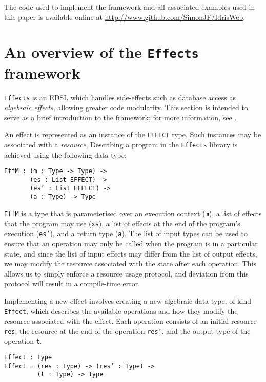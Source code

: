 \documentclass[preprint]{sigplanconf}
\begin{document}
The code used to implement the framework and all associated examples used in this paper is available online at \url{http://www.github.com/SimonJF/IdrisWeb}.

\section{An overview of the \texttt{Effects} framework}
\label{effects}
\texttt{Effects} is an EDSL which handles side-effects such as database access
as \textit{algebraic effects}, allowing greater code modularity. This section
is intended to serve as a brief introduction to the framework; for more
information, see \cite{brady:effects}.

An effect is represented as an instance of the \texttt{EFFECT} type. Such
instances may be associated with a \textit{resource}, Describing a program in
the \texttt{Effects} library is achieved using the following data type:

\begin{Verbatim}
EffM : (m : Type -> Type) ->
       (es : List EFFECT) ->
       (es’ : List EFFECT) ->
       (a : Type) -> Type
\end{Verbatim}
\texttt{EffM} is a type that is parameterised over an execution context
(\texttt{m}), a list of effects that the program may use (\texttt{xs}), a list
of effects at the end of the program's execution (\texttt{es'}), and a return
type (\texttt{a}). The list of input types can be used to ensure that an
operation may only be called when the program is in a particular state, and
since the list of input effects may differ from the list of output effects, we
may modify the resource associated with the state after each operation. This
allows us to simply enforce a resource usage protocol, and deviation from this
protocol will result in a compile-time error.

Implementing a new effect involves creating a new algebraic data type, of kind
\texttt{Effect}, which describes the available operations and how they modify
the resource associated with the effect. Each operation consists of an initial
resource \texttt{res}, the resource at the end of the operation \texttt{res'},
and the output type of the operation \texttt{t}.

\begin{Verbatim}
Effect : Type
Effect = (res : Type) -> (res’ : Type) ->
         (t : Type) -> Type
\end{Verbatim}
\end{document}

